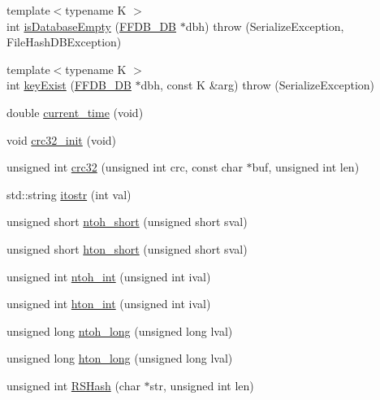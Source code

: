 \begin{DoxyCompactItemize}
\item 
{\footnotesize template$<$typename K $>$ }\\int \mbox{\hyperlink{namespaceFILEDB_a25ba56393bd11f7e104de43478a253de}{is\+Database\+Empty}} (\mbox{\hyperlink{other__libs_2filedb_2filehash_2ffdb__db_8h_a0b27b956926453a7a8141ea8e10f0df8}{F\+F\+D\+B\+\_\+\+DB}} $\ast$dbh)  throw (\+Serialize\+Exception, File\+Hash\+D\+B\+Exception)
\item 
{\footnotesize template$<$typename K $>$ }\\int \mbox{\hyperlink{namespaceFILEDB_a693e2659d01ea18edb88d796d7cbd5de}{key\+Exist}} (\mbox{\hyperlink{other__libs_2filedb_2filehash_2ffdb__db_8h_a0b27b956926453a7a8141ea8e10f0df8}{F\+F\+D\+B\+\_\+\+DB}} $\ast$dbh, const K \&arg)  throw (\+Serialize\+Exception)
\item 
double \mbox{\hyperlink{namespaceFILEDB_a52d0505cdd535797c05bffb0598ef2a5}{current\+\_\+time}} (void)
\item 
void \mbox{\hyperlink{namespaceFILEDB_ad0296230a6c6ba4b757820d4367275a4}{crc32\+\_\+init}} (void)
\item 
unsigned int \mbox{\hyperlink{namespaceFILEDB_aa12ea161a9698d1b53c1026b06f0b0a5}{crc32}} (unsigned int crc, const char $\ast$buf, unsigned int len)
\item 
std\+::string \mbox{\hyperlink{namespaceFILEDB_a00ba2326eea8f8eb8dc3b4be5eac2bf3}{itostr}} (int val)
\item 
unsigned short \mbox{\hyperlink{namespaceFILEDB_af28aef063f95fcb331d3844f6807daf5}{ntoh\+\_\+short}} (unsigned short sval)
\item 
unsigned short \mbox{\hyperlink{namespaceFILEDB_acbb57ab648e150c1950a7e6a67a6aa56}{hton\+\_\+short}} (unsigned short sval)
\item 
unsigned int \mbox{\hyperlink{namespaceFILEDB_ab34ff6954f1b3a0dc868119d34105579}{ntoh\+\_\+int}} (unsigned int ival)
\item 
unsigned int \mbox{\hyperlink{namespaceFILEDB_adbce406e3e06947d7312a6d461bc5cc5}{hton\+\_\+int}} (unsigned int ival)
\item 
unsigned long \mbox{\hyperlink{namespaceFILEDB_af2fbdeeb7148fa47d1050b1ac3130897}{ntoh\+\_\+long}} (unsigned long lval)
\item 
unsigned long \mbox{\hyperlink{namespaceFILEDB_af381773a642a4cc9c68ce682cea411a8}{hton\+\_\+long}} (unsigned long lval)
\item 
unsigned int \mbox{\hyperlink{namespaceFILEDB_ac69ca4109f796be06f658542b20a3eb1}{R\+S\+Hash}} (char $\ast$str, unsigned int len)

\end{DoxyCompactItemize}
